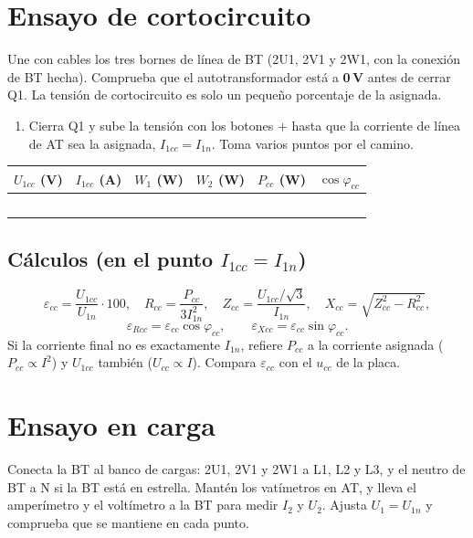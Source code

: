 \documentclass[11pt,a4paper]{article}
\begin{document}
\section{Ensayo de cortocircuito}
\begin{seguridad}
  Une con cables los tres bornes de línea de BT (2U1, 2V1 y 2W1, con la conexión de BT hecha). Comprueba que el autotransformador está a \textbf{0\,V} antes de cerrar Q1. La tensión de cortocircuito es solo un pequeño porcentaje de la asignada.
\end{seguridad}

\begin{enumerate}
  \item Cierra Q1 y sube la tensión con los botones $+$ hasta que la corriente de línea de AT sea la asignada, $I_{1cc} = I_{1n}$. Toma varios puntos por el camino.
\end{enumerate}

\begin{tabularx}{\textwidth}{|C|C|C|C|C|C|}
  \hline
  $U_{1cc}$ (V) & $I_{1cc}$ (A) & $W_1$ (W) & $W_2$ (W) & $P_{cc}$ (W) & $\cos\varphi_{cc}$ \\ \hline
   & & & & & \\[5pt] \hline
   & & & & & \\[5pt] \hline
   & & & & & \\[5pt] \hline
   & & & & & \\[5pt] \hline
   & & & & & \\[5pt] \hline
\end{tabularx}

\subsection*{Cálculos (en el punto $I_{1cc} = I_{1n}$)}
\[
  \varepsilon_{cc} = \frac{U_{1cc}}{U_{1n}}\cdot 100, \quad
  R_{cc} = \frac{P_{cc}}{3 I_{1n}^2}, \quad
  Z_{cc} = \frac{U_{1cc}/\sqrt3}{I_{1n}}, \quad
  X_{cc} = \sqrt{Z_{cc}^2 - R_{cc}^2},
\]
\[
  \varepsilon_{Rcc} = \varepsilon_{cc}\cos\varphi_{cc}, \qquad \varepsilon_{Xcc} = \varepsilon_{cc}\sin\varphi_{cc}.
\]
Si la corriente final no es exactamente $I_{1n}$, refiere $P_{cc}$ a la corriente asignada ($P_{cc} \propto I^2$) y $U_{1cc}$ también ($U_{cc} \propto I$). Compara $\varepsilon_{cc}$ con el $u_{cc}$ de la placa.

\section{Ensayo en carga}
Conecta la BT al banco de cargas: 2U1, 2V1 y 2W1 a L1, L2 y L3, y el neutro de BT a N si la BT está en estrella. Mantén los vatímetros en AT, y lleva el amperímetro y el voltímetro a la BT para medir $I_2$ y $U_2$. Ajusta $U_1 = U_{1n}$ y comprueba que se mantiene en cada punto.
\end{document}
